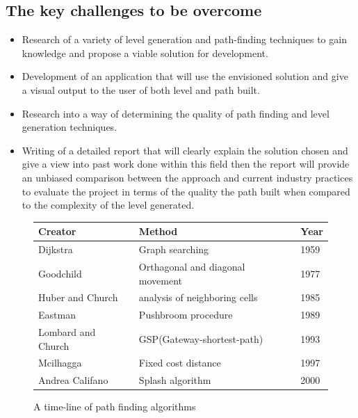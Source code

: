 \subsection{The key challenges to be overcome}
\begin{itemize}
\item  Research of a variety of level generation and path-finding techniques to gain knowledge and propose a viable solution for development.\\
\item Development of  an application that will use the envisioned solution and give a visual output to the user of both level and path built.\\
\item Research into a way of determining the quality of path finding and level generation techniques.\\
\item Writing of a detailed report that will clearly explain the solution chosen and give a view into past work done within this field then the report will provide an unbiased comparison between the approach and current industry practices to evaluate the project in terms of the quality the path built when compared to the complexity of the level generated.
\end{itemize}

\begin{figure}[ht!]
	\begin{tabular}{ |p{5cm}|p{3.5cm}|p{0.8cm}|}
	\hline
            Creator & Method & Year \\
             \hline
            Dijkstra \cite{dijkstra} & Graph searching & 1959 \\
            \hline
            Goodchild \cite{goodchild} & Orthagonal and diagonal movement & 1977\\
            \hline
            Huber and Church \cite{huber} & analysis of neighboring cells & 1985\\
            \hline
            Eastman \cite{eastman} & Pushbroom procedure & 1989\\
            \hline
            Lombard and Church \cite{lombard} & GSP(Gateway-shortest-path) & 1993\\
            \hline
            Mcilhagga \cite{mcilhagga} & Fixed cost distance & 1997\\
            \hline
            Andrea Califano \cite{califano} & Splash algorithm & 2000\\ 
            \hline
\end{tabular} 
	\caption{A time-line of path finding algorithms}	 \label{timeline} \cite{Time}
\end{figure}

